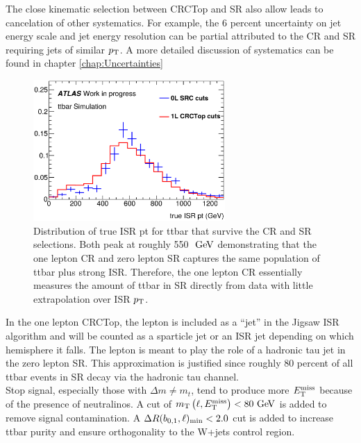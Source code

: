 \indent The close kinematic selection between CRCTop and SR also allow leads to cancelation of other systematics.   For example, the 6 percent uncertainty on jet energy scale and jet energy resolution can be partial attributed to the CR and SR requiring jets of similar $p_{\mathrm{T}}$. A more detailed discussion of systematics can be found in chapter \ref{chap:Uncertainties} \\

\begin{figure}[h!]
  \centering
	\includegraphics[width=0.65\textwidth]{./figures/ttbar/truePtISR_SRC_CRC_compare.eps}
\caption{\label{fig:ttbar:CR:trueISRpt}{Distribution of true ISR pt for ttbar that survive the CR and SR selections.  Both peak at roughly 550 $\gev$ demonstrating that the one lepton CR and zero lepton SR captures the same population of ttbar plus strong ISR.  Therefore, the one lepton CR essentially measures the amount of ttbar in SR directly from data with little extrapolation over ISR $p_{\mathrm{T}}$.}}
\end{figure}

\indent In the one lepton CRCTop, the lepton is included as a ``jet'' in the Jigsaw ISR algorithm and will be counted as a sparticle jet or an ISR jet depending on which hemisphere it falls.  The lepton is meant to play the role of a hadronic tau jet in the zero lepton SR.  This approximation is justified since roughly 80 percent of all ttbar events in SR decay via the hadronic tau channel.  \\

\indent  Stop signal, especially those with $\Delta m \neq m_{t}$, tend to produce more $E_{\mathrm{T}}^{\mathrm{miss}}$ because of the presence of neutralinos.  A cut of $\mtlepmet < 80\gev$ is added to remove signal contamination.  
A $\Delta R(b_{0,1},\ell)_{\mathrm{min}}<2.0$ cut is added to increase ttbar purity and ensure orthogonality to the W+jets control region. \\

